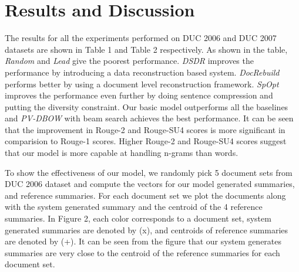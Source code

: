 \documentclass[11pt,a4paper]{article}
\begin{document}



\section{Results and Discussion}
\label{sec:blind}

The results for all the experiments performed on DUC 2006 and DUC 2007 datasets are shown in Table 1 and Table 2 respectively. 
As shown in the table, \textit{Random} and \textit{Lead} give the poorest performance. \textit{DSDR} improves the performance by introducing a data reconstruction based system. \textit{DocRebuild} performs better by using a document level reconstruction framework. \textit{SpOpt} improves the performance even further by doing sentence compression and putting the diversity constraint. Our basic model outperforms all the baselines and \textit{PV-DBOW} with beam search achieves the best performance. It can be seen that the improvement in Rouge-2 and Rouge-SU4 scores is more significant in comparision to Rouge-1 scores. Higher Rouge-2 and Rouge-SU4 scores suggest that our model is more capable at handling n-grams than words.





To show the effectiveness of our model, we randomly pick 5 document sets from DUC 2006 dataset and compute the vectors for our model generated summaries, and reference summaries. For each document set we plot the documents along with the system generated summary and the centroid of the 4 reference summaries. In Figure 2, each color corresponds to a document set, system generated summaries are denoted by (x), and centroids of reference summaries are denoted by (+). It can be seen from the figure that our system generates summaries are very close to the centroid of the reference summaries for each document set. 
\end{document}
